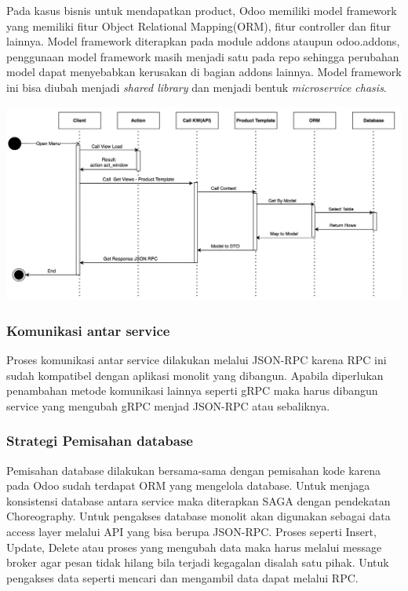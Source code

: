 Pada kasus bisnis untuk mendapatkan product, Odoo memiliki model framework yang memiliki fitur Object Relational Mapping(ORM), fitur controller dan fitur lainnya. Model framework diterapkan pada module addons ataupun odoo.addons, penggunaan model framework masih menjadi satu pada repo sehingga perubahan model dapat menyebabkan kerusakan di bagian addons lainnya. Model framework ini bisa diubah menjadi \textit{shared library} dan menjadi bentuk \textit{microservice chasis}.\\
\begin{center}
	\includegraphics[width=14cm]{img/bab_3/seqDiagGet.png}
	\label{fig:asd}
\end{center}
\subsubsection{Komunikasi antar service}
Proses komunikasi antar service dilakukan melalui JSON-RPC karena RPC ini sudah kompatibel dengan aplikasi monolit yang dibangun. Apabila diperlukan penambahan metode komunikasi lainnya seperti gRPC maka harus dibangun service yang mengubah gRPC menjad JSON-RPC atau sebaliknya.  
\\
\subsubsection{Strategi Pemisahan database}
Pemisahan database dilakukan bersama-sama dengan pemisahan kode karena pada Odoo sudah terdapat ORM yang mengelola database. Untuk menjaga konsistensi database antara service maka diterapkan SAGA dengan pendekatan Choreography. Untuk pengakses database monolit akan digunakan sebagai data access layer melalui API yang bisa berupa JSON-RPC. Proses seperti Insert, Update, Delete atau proses yang mengubah data maka harus melalui message broker agar pesan tidak hilang bila terjadi kegagalan disalah satu pihak. Untuk pengakses data seperti mencari dan mengambil data dapat melalui RPC.
\\
